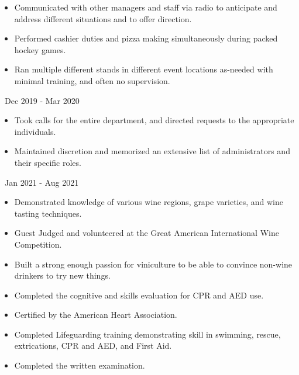 \documentclass[11pt,letterpaper,ragged2e]{altacv}
\begin{document}
{
	\begin{itemize}
		\item{Communicated with other managers and staff via radio to anticipate and address different situations and to offer direction.}
		\item{Performed cashier duties and pizza making simultaneously during packed hockey games.}
		\item{Ran multiple different stands in different event locations as-needed with minimal training, and often no supervision.}
	\end{itemize}
}
{\faCalendar\, Dec 2019 - Mar 2020}
{
}

{
	\begin{itemize}
		\item{Took calls for the entire department, and directed requests to the appropriate individuals.}
		\item{Maintained discretion and memorized an extensive list of administrators and their specific roles.}
	\end{itemize}
}
{\faCalendar\, Jan 2021 - Aug 2021}
{
}



{
	\begin{itemize}
		\item{Demonstrated knowledge of various wine regions, grape varieties, and wine tasting techniques.}
		\item{Guest Judged and volunteered at the Great American International Wine Competition.}
		\item{Built a strong enough passion for viniculture to be able to convince non-wine drinkers to try new things.}
	\end{itemize}
}
{
}

{
	\begin{itemize}
		\item{Completed the cognitive and skills evaluation for CPR and AED use.}
		\item{Certified by the American Heart Association.}
	\end{itemize}
}
{
}

{
	\begin{itemize}
		\item{Completed Lifeguarding training demonstrating skill in swimming, rescue, extrications, CPR and AED, and  First Aid.}
		\item{Completed the written examination.}
	\end{itemize}
}
{
}


\clearpage

\nocite{*}
\end{document}
